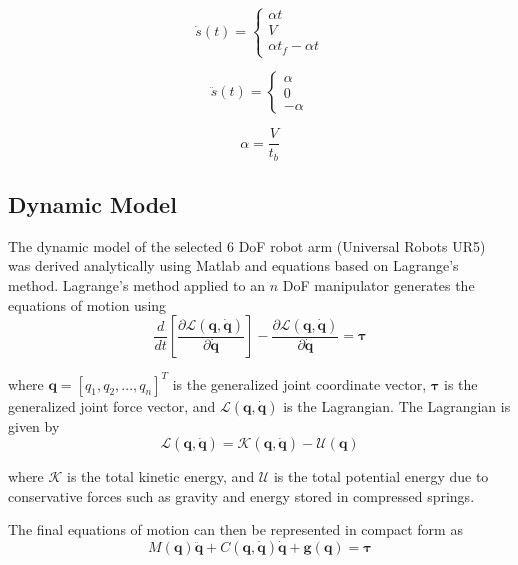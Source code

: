 \documentclass[conference]{IEEEtran}
\begin{document}
\begin{equation*}
  \dot{s}(t) =
  \begin{cases}
    \alpha t \\
    V \\
    \alpha t_f - \alpha t
  \end{cases}
\end{equation*}

\begin{equation*}
  \ddot{s}(t) =
  \begin{cases}
    \alpha \\
    0 \\
    -\alpha
  \end{cases}
\end{equation*}

\begin{equation*}
  \alpha = \frac{V}{t_b}
\end{equation*}


\subsection{Dynamic Model}
The dynamic model of the selected 6 DoF robot arm (Universal Robots UR5) was
derived analytically using Matlab and equations based on Lagrange's
method. Lagrange's method applied to an $n$ DoF manipulator generates the
equations of motion using
\begin{equation*}
  \frac{d}{dt} \left[ \frac{\partial \mathcal{L}(\boldsymbol{q}, \dot{\boldsymbol{q}})}{\partial \dot{\boldsymbol{q}}} \right] - \frac{\partial \mathcal{L}(\boldsymbol{q}, \dot{\boldsymbol{q}})}{\partial \dot{\boldsymbol{q}}} = \boldsymbol{\tau}
\end{equation*}

where $\boldsymbol{q}=[q_1, q_2, ..., q_n]^T$ is the generalized joint
coordinate vector, $\boldsymbol{\tau}$ is the generalized joint force vector,
and $\mathcal{L}(\boldsymbol{q}, \dot{\boldsymbol{q}})$ is the Lagrangian. The
Lagrangian is given by
\begin{equation*}
  \mathcal{L}(\boldsymbol{q}, \dot{\boldsymbol{q}}) = \mathcal{K}(\boldsymbol{q}, \dot{\boldsymbol{q}}) - \mathcal{U}(\boldsymbol{q})
\end{equation*}

where $\mathcal{K}$ is the total kinetic energy, and $\mathcal{U}$ is the total
potential energy due to conservative forces such as gravity and energy stored in
compressed springs.

The final equations of motion can then be represented in compact form as
\begin{equation*}
  M(\boldsymbol{q})\ddot{\boldsymbol{q}} + C(\boldsymbol{q}, \dot{\boldsymbol{q}})\dot{\boldsymbol{q}} + \boldsymbol{g}(\boldsymbol{q}) = \boldsymbol{\tau}
\end{equation*}
\end{document}
